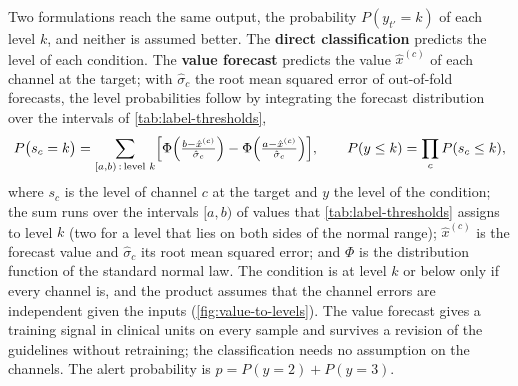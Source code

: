 Two formulations reach the same output, the probability $P(y_{t'} = k)$ of each level $k$, and neither is assumed better. The \textbf{direct classification} predicts the level of each condition. The \textbf{value forecast} predicts the value $\hat{x}^{(c)}$ of each channel at the target; with $\hat\sigma_c$ the root mean squared error of out-of-fold forecasts, the level probabilities follow by integrating the forecast distribution over the intervals of \cref{tab:label-thresholds},
\begin{equation}
  P\bigl(s_c = k\bigr) = \sum_{[a,b)\,:\,\text{level } k} \Bigl[\Phi\Bigl(\tfrac{b - \hat{x}^{(c)}}{\hat\sigma_c}\Bigr) - \Phi\Bigl(\tfrac{a - \hat{x}^{(c)}}{\hat\sigma_c}\Bigr)\Bigr],
  \qquad P(y \leq k) = \prod_c P(s_c \leq k),
\end{equation}
where $s_c$ is the level of channel $c$ at the target and $y$ the level of the condition; the sum runs over the intervals $[a,b)$ of values that \cref{tab:label-thresholds} assigns to level $k$ (two for a level that lies on both sides of the normal range); $\hat{x}^{(c)}$ is the forecast value and $\hat\sigma_c$ its root mean squared error; and $\Phi$ is the distribution function of the standard normal law. The condition is at level $k$ or below only if every channel is, and the product assumes that the channel errors are independent given the inputs (\cref{fig:value-to-levels}). The value forecast gives a training signal in clinical units on every sample and survives a revision of the guidelines without retraining; the classification needs no assumption on the channels. The alert probability is $p = P(y = 2) + P(y = 3)$.

